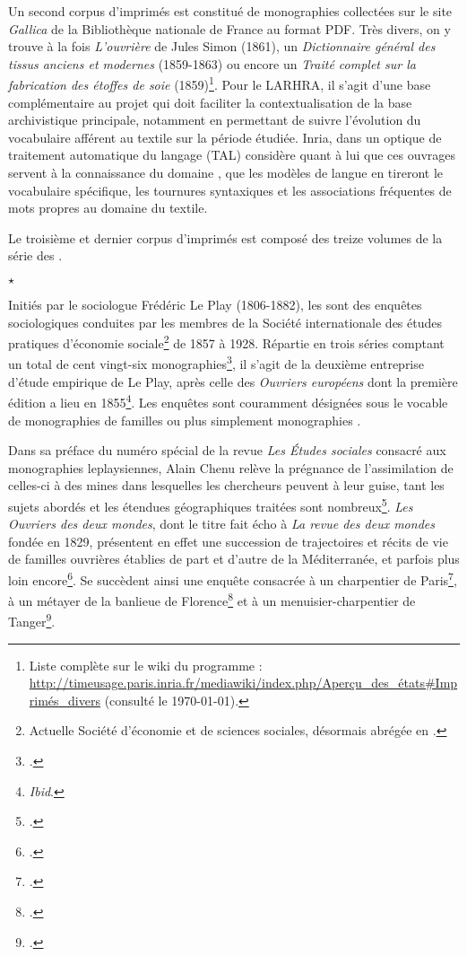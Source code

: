 Un second corpus d'imprimés est constitué de monographies collectées sur le site \textit{Gallica} de la Bibliothèque nationale de France au format PDF. Très divers, on y trouve à la fois \textit{L'ouvrière} de Jules Simon (1861), un \textit{Dictionnaire général des tissus anciens et modernes} (1859-1863) ou encore un \textit{Traité complet sur la fabrication des étoffes de soie} (1859)\footnote{Liste complète sur le wiki du programme : \url{http://timeusage.paris.inria.fr/mediawiki/index.php/Aperçu_des_états\#Imprimés_divers} (consulté le \today).}. Pour le LARHRA, il s'agit d'une base complémentaire au projet qui doit faciliter la contextualisation de la base archivistique principale, notamment en permettant de suivre l'évolution du  vocabulaire afférent au textile sur la période étudiée. Inria, dans un optique de traitement automatique du langage (TAL) considère quant à lui que ces ouvrages servent à la \og connaissance du domaine \fg{}, \cad{} que les modèles de langue en tireront le vocabulaire spécifique, les tournures syntaxiques et les associations fréquentes de mots propres au domaine du textile.

Le troisième et dernier corpus d'imprimés est composé des treize volumes de la série des \odm.

\begin{center}
$\star$
\end{center} 

Initiés par le sociologue Frédéric Le Play (1806-1882), les \odm{} sont des enquêtes sociologiques conduites par les membres de la Société internationale des études pratiques d’économie sociale\footnote{Actuelle Société d'économie et de sciences sociales, désormais abrégée en \sess.} de 1857 à 1928. Répartie en trois séries comptant un total de cent vingt-six monographies\footnote{\cite[p. 95]{lorry}.}, il s'agit de la deuxième entreprise d'étude empirique de Le Play, après celle des \textit{Ouvriers européens} dont la première édition a lieu en 1855\footnote{\textit{Ibid}.}. Les enquêtes sont couramment désignées sous le vocable de \og monographies de familles \fg{} ou plus simplement \og monographies \fg{}.

Dans sa préface du numéro spécial de la revue \textit{Les Études sociales} consacré aux monographies leplaysiennes, Alain Chenu relève la prégnance de l'assimilation de celles-ci à des \og mines \fg{} dans lesquelles les chercheurs peuvent \og [puiser] \fg{} à leur guise, tant les sujets abordés et les étendues géographiques traitées sont nombreux\footnote{\cite[p. 5]{chenu}.}. \textit{Les Ouvriers des deux mondes}, dont le titre fait écho à \textit{La revue des deux mondes} fondée en 1829, présentent en effet une succession de \og trajectoires et récits de vie de familles ouvrières \fg{} établies de part et d'autre de la Méditerranée, et parfois plus loin encore\footnote{\cite[p. 193]{baciocchi}.}. Se succèdent ainsi une enquête consacrée à un charpentier de Paris\footcite{mono001a}, à un métayer de la banlieue de Florence\footcite{mono005a} et à un menuisier-charpentier de Tanger\footcite{mono012a}.

